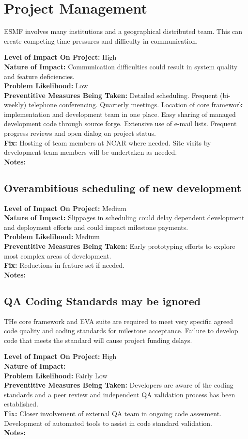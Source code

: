 \documentclass[english]{article}
\newcommand{\req}[1]{\section{\hspace{.2in}#1}}
\newcommand{\sreq}[1]{\subsection{\hspace{.2in}#1}}
\newenvironment
{reqlist}
{\begin{list} {} {} \rm \item[]}
{\end{list}}
\begin{document}
\req{Project Management}
ESMF involves many institutions and a geographical distributed team. 
This can create competing time pressures and difficulty in communication.

\begin{reqlist}
{\bf Level of Impact On Project:} High \\
{\bf Nature of Impact:} Communication difficulties could result in system quality and feature deficiencies. \\
{\bf Problem Likelihood:} Low \\
{\bf Preventitive Measures Being Taken:} Detailed scheduling. Frequent (bi-weekly) telephone
conferencing. Quarterly meetings. Location of core framework implementation and development
team in one place. Easy sharing of managed development code through source forge. 
Extensive use of e-mail lists. Frequent progress reviews and open dialog on project status.
\\
{\bf Fix:} Hosting of team members at NCAR where needed.
Site visits by development team members will be undertaken as needed.
\\
{\bf Notes:} 
\end{reqlist}

\sreq{Overambitious scheduling of new development}
\begin{reqlist}
{\bf Level of Impact On Project:} Medium \\
{\bf Nature of Impact:} Slippages in scheduling could delay dependent development and deployment efforts and could impact milestone payments.  \\
{\bf Problem Likelihood:} Medium \\
{\bf Preventitive Measures Being Taken:} Early prototyping efforts to explore most
complex areas of development.
\\
{\bf Fix:} Reductions in feature set if needed.
\\
{\bf Notes:} 
\end{reqlist}


\sreq{QA Coding Standards may be ignored}
THe core framework and EVA suite are required to meet very specific agreed code quality and coding
standards for milestone acceptance. Failure to develop code that meets the
standard will cause project funding delays.
\begin{reqlist}
{\bf Level of Impact On Project:} High \\
{\bf Nature of Impact:} \\
{\bf Problem Likelihood:} Fairly Low \\
{\bf Preventitive Measures Being Taken:} Developers are aware of the
coding standards and a peer review and independent QA validation process
has been established.
\\
{\bf Fix:} Closer involvement of external QA team in ongoing code 
assesment. Development of automated tools to assist in code standard validation.
\\
{\bf Notes:} 
\end{reqlist}
\end{document}
